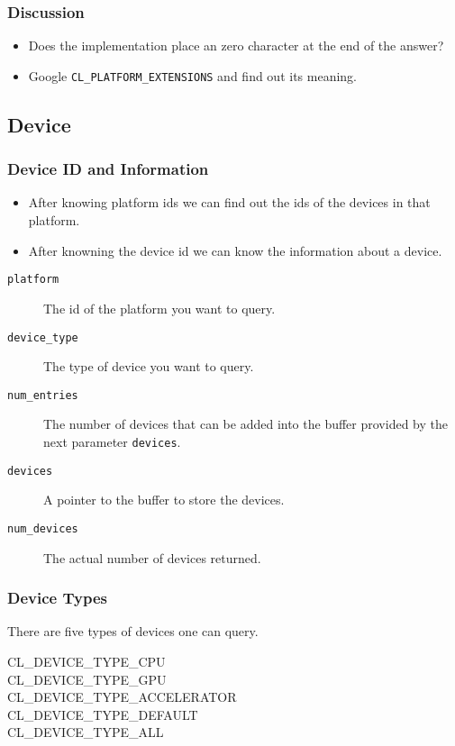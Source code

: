 \documentclass{beamer}
\begin{document}
\begin{frame}
  \frametitle{Discussion}
  \begin{itemize}
  \item Does the implementation place an zero character at the end of
    the answer?
  \item Google {\tt CL\_PLATFORM\_EXTENSIONS} and find out its
    meaning.
  \end{itemize}
\end{frame}

\subsection{Device}

\begin{frame}
  \frametitle{Device ID and Information}
  \begin{itemize}
    \item After knowing platform ids we can find out the ids of the
      devices in that platform.
    \item After knowning the device id we can know the information
      about a device.
  \end{itemize}
\end{frame}

\begin{frame}
\end{frame}

\begin{frame}
  \begin{description}
  \item [\tt platform] The id of the platform you want to query.
  \item [\tt device\_type] The type of device you want to query.
  \item [\tt num\_entries] The number of devices that can be added into
    the buffer provided by the next parameter {\tt devices}.
  \item [\tt devices] A pointer to the buffer to store the devices.
  \item [\tt num\_devices] The actual number of devices returned.
  \end{description}
\end{frame}

\begin{frame}
  \frametitle{Device Types}
  There are five types of devices one can query.
  \begin{description}
  \item[CL\_DEVICE\_TYPE\_CPU]
  \item[CL\_DEVICE\_TYPE\_GPU]
  \item[CL\_DEVICE\_TYPE\_ACCELERATOR]
  \item[CL\_DEVICE\_TYPE\_DEFAULT]
  \item[CL\_DEVICE\_TYPE\_ALL]
  \end{description}
\end{frame}
\end{document}
